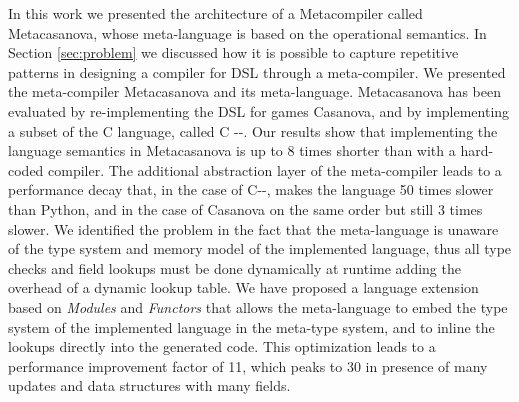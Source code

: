 \balance
In this work we presented the architecture of a Metacompiler called Metacasanova, whose meta-language is based on the operational semantics. In Section \ref{sec:problem} we discussed how it is possible to capture repetitive patterns in designing a compiler for DSL through a meta-compiler. We presented the meta-compiler Metacasanova and its meta-language. Metacasanova has been evaluated by re-implementing the DSL for games Casanova, and by implementing a subset of the C language, called C -{}-. Our results show that implementing the language semantics in Metacasanova is up to 8 times shorter than with a hard-coded compiler. The additional abstraction layer of the meta-compiler leads to a performance decay that, in the case of C-{}-, makes the language 50 times slower than Python, and in the case of Casanova on the same order but still 3 times slower. We identified the problem in the fact that the meta-language is unaware of the type system and memory model of the implemented language, thus all type checks and field lookups must be done dynamically at runtime adding the overhead of a dynamic lookup table. We have proposed a language extension based on \textit{Modules} and \textit{Functors} that allows the meta-language to embed the type system of the implemented language in the meta-type system, and to inline the lookups directly into the generated code. This optimization leads to a performance improvement factor of 11, which peaks to 30 in presence of many updates and data structures with many fields.
